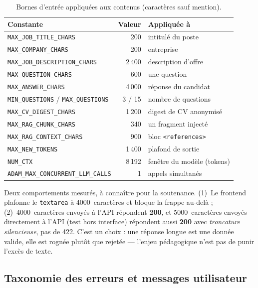 \begin{small}
\begin{table}[H]
\centering
\caption{Bornes d'entrée appliquées aux contenus (caractères sauf mention).}
\label{tab:limites}
\begin{tabular}{@{}l r l@{}}
\toprule
\textbf{Constante} & \textbf{Valeur} & \textbf{Appliquée à} \\
\midrule
\texttt{MAX\_JOB\_TITLE\_CHARS}     & 200  & intitulé du poste \\
\texttt{MAX\_COMPANY\_CHARS}        & 200  & entreprise \\
\texttt{MAX\_JOB\_DESCRIPTION\_CHARS} & 2\,400 & description d'offre \\
\texttt{MAX\_QUESTION\_CHARS}       & 600  & une question \\
\texttt{MAX\_ANSWER\_CHARS}         & 4\,000 & réponse du candidat \\
\texttt{MIN\_QUESTIONS} / \texttt{MAX\_QUESTIONS} & 3 / 15 & nombre de questions \\
\texttt{MAX\_CV\_DIGEST\_CHARS}     & 1\,200 & digest de CV anonymisé \\
\texttt{MAX\_RAG\_CHUNK\_CHARS}     & 340  & un fragment injecté \\
\texttt{MAX\_RAG\_CONTEXT\_CHARS}   & 900  & bloc \texttt{<references>} \\
\texttt{MAX\_NEW\_TOKENS}           & 1\,400 & plafond de sortie \\
\texttt{NUM\_CTX}                   & 8\,192 & fenêtre du modèle (tokens) \\
\texttt{ADAM\_MAX\_CONCURRENT\_LLM\_CALLS} & 1 & appels simultanés \\
\bottomrule
\end{tabular}
\end{table}
\end{small}

Deux comportements mesurés, à connaître pour la soutenance. (1)~Le frontend
plafonne le \texttt{textarea} à 4000~caractères et bloque la frappe au-delà ;
(2)~4000~caractères envoyés à l'API répondent \textbf{200}, et 5000~caractères
envoyés directement à l'API (test hors interface) répondent aussi \textbf{200}
avec \emph{troncature silencieuse}, pas de 422. C'est un choix : une réponse
longue est une donnée valide, elle est rognée plutôt que rejetée --- l'enjeu
pédagogique n'est pas de punir l'excès de texte.

\subsection{Taxonomie des erreurs et messages utilisateur}
\label{sec:sec-erreurs}

